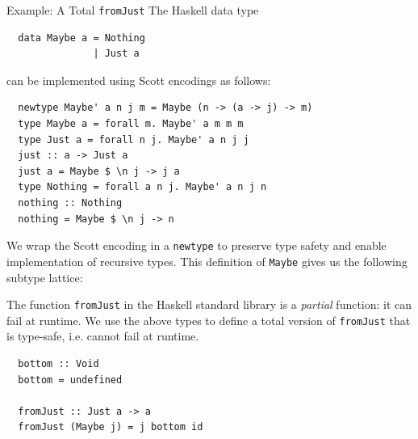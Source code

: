 \documentclass[final]{beamer}
\begin{document}
\begin{frame}[fragile]
\begin{columns}[t]
\begin{column}{.33\textwidth}
\begin{block}{Example: A Total \texttt{fromJust}}
\vspace{0.5cm}
The Haskell data type

\begin{verbatim}
  data Maybe a = Nothing
               | Just a
\end{verbatim}

can be implemented using Scott encodings as follows:

\begin{verbatim}
  newtype Maybe' a n j m = Maybe (n -> (a -> j) -> m)
  type Maybe a = forall m. Maybe' a m m m 
  type Just a = forall n j. Maybe' a n j j
  just :: a -> Just a
  just a = Maybe $ \n j -> j a
  type Nothing = forall a n j. Maybe' a n j n
  nothing :: Nothing
  nothing = Maybe $ \n j -> n
\end{verbatim}

We wrap the Scott encoding in a \texttt{newtype} to preserve type safety and
enable implementation of recursive types. This definition of \texttt{Maybe}
gives us the following subtype lattice:

\begin{figure}[!h]
\centering
{}
\end{figure}

The function \texttt{fromJust} in the Haskell standard library is a
\emph{partial} function: it can fail at runtime. We use the above types to
define a total version of \texttt{fromJust} that is type-safe, i.e. cannot
fail at runtime.

\begin{verbatim}
  bottom :: Void
  bottom = undefined

  fromJust :: Just a -> a
  fromJust (Maybe j) = j bottom id 
\end{verbatim}

\end{block}

\end{column}


\end{columns}
\end{frame}
\end{document}
